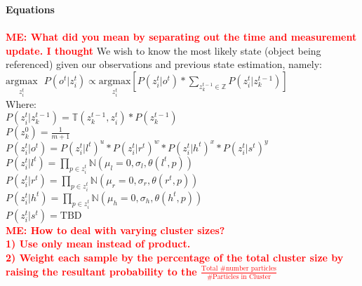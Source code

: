 \documentclass[12pt,letterpaper]{article}
\newcommand{\menote}[1]{\textcolor{Red}{\textbf{ME: #1}}}
\begin{document}
\textbf{Equations}\\\\
\menote{What did you mean by separating out the time and measurement update. I thought }
We wish to know the most likely state (object being referenced) given our observations and previous state estimation, namely:\\
$\underset{z^t_i}{\text{argmax}}\text{ }P(o^t |z_i^t) \propto\underset{z^t_i}{\text{argmax}}[P(z^t_i | o^t)*\displaystyle\sum_{z^{t-1}_k \in \mathbb{Z}} P(z^t_i|z^{t-1}_k)] $\\
Where:\\
$P(z^t_i | z^{t-1}_k) = \mathbb{T}(z^{t-1}_k, z^t_i)*P(z^{t-1}_k)$\\
$P(z^0_k) = \frac{1}{m+1}$\\
$P(z^t_i|o^t) = P(z^t_i|l^t)^u*P(z^t_i|r^t)^w*P(z^t_i|h^t)^x*P(z^t_i|s^t)^y$\\
$P(z^t_i|l^t) = \displaystyle \prod_{p \in z^t_i} \mathbb{N}(\mu_l=0, \sigma_l, \theta(l^t, p))$\\
$P(z^t_i|r^t)=\displaystyle \prod_{p \in z^t_i} \mathbb{N}(\mu_r=0, \sigma_r, \theta(r^t, p))$\\
$P(z^t_i|h^t) =\displaystyle \prod_{p \in z^t_i} \mathbb{N}(\mu_h=0, \sigma_h, \theta(h^t, p))$\\
$P(z^t_i|s^t) = \text{TBD}$\\
\menote{How to deal with varying cluster sizes?\\
1) Use only mean instead of product.\\
2) Weight each sample by the percentage of the total cluster size by raising the resultant probability to the $\frac{\text{Total \# number particles}}{\text{\# Particles in Cluster}}$
}
\end{document}
